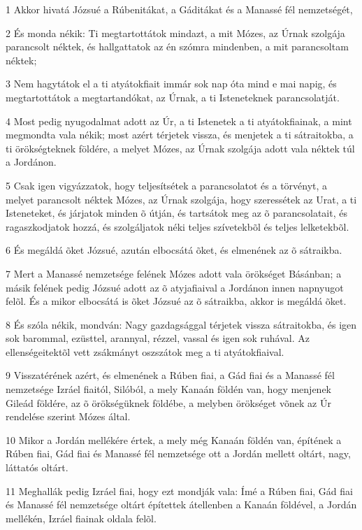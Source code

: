 \par 1 Akkor hivatá Józsué a Rúbenitákat, a Gáditákat és a Manassé fél nemzetségét,
\par 2 És monda nékik: Ti megtartottátok mindazt, a mit Mózes, az Úrnak szolgája parancsolt néktek, és hallgattatok az én szómra mindenben, a mit parancsoltam néktek;
\par 3 Nem hagytátok el a ti atyátokfiait immár sok nap óta mind e mai napig, és megtartottátok a megtartandókat, az Úrnak, a ti Isteneteknek parancsolatját.
\par 4 Most pedig nyugodalmat adott az Úr, a ti Istenetek a ti atyátokfiainak, a mint megmondta vala nékik; most azért térjetek vissza, és menjetek a ti sátraitokba, a ti örökségteknek földére, a melyet Mózes, az Úrnak szolgája adott vala néktek túl a Jordánon.
\par 5 Csak igen vigyázzatok, hogy teljesítsétek a parancsolatot és a törvényt, a melyet parancsolt néktek Mózes, az Úrnak szolgája, hogy szeressétek az Urat, a ti Isteneteket, és járjatok minden õ útján, és tartsátok meg az õ parancsolatait, és ragaszkodjatok hozzá, és szolgáljatok néki teljes szívetekbõl és teljes lelketekbõl.
\par 6 És megáldá õket Józsué, azután elbocsátá õket, és elmenének az õ sátraikba.
\par 7 Mert a Manassé nemzetsége felének Mózes adott vala örökséget Básánban; a másik felének pedig Józsué adott az õ atyjafiaival a Jordánon innen napnyugot felõl. És a mikor elbocsátá is õket Józsué az õ sátraikba, akkor is megáldá õket.
\par 8 És szóla nékik, mondván: Nagy gazdagsággal térjetek vissza sátraitokba, és igen sok barommal, ezüsttel, arannyal, rézzel, vassal és igen sok ruhával. Az ellenségeitektõl vett zsákmányt oszszátok meg a ti atyátokfiaival.
\par 9 Visszatérének azért, és elmenének a Rúben fiai, a Gád fiai és a Manassé fél nemzetsége Izráel fiaitól, Silóból, a mely Kanaán földén van, hogy menjenek Gileád földére, az õ örökségüknek földébe, a melyben örökséget võnek az Úr rendelése szerint Mózes által.
\par 10 Mikor a Jordán mellékére értek, a mely még Kanaán földén van, építének a Rúben fiai, Gád fiai és Manassé fél nemzetsége ott a Jordán mellett oltárt, nagy, láttatós oltárt.
\par 11 Meghallák pedig Izráel fiai, hogy ezt mondják vala: Ímé a Rúben fiai, Gád fiai és Manassé fél nemzetsége oltárt építettek átellenben a Kanaán földével, a Jordán mellékén, Izráel fiainak oldala felõl.
